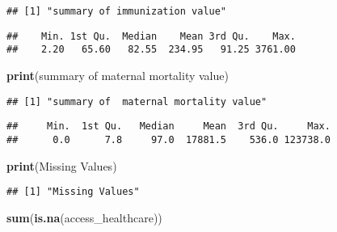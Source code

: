\documentclass[
]{article}
\newenvironment{Shaded}{\begin{snugshade}}{\end{snugshade}}
\newcommand{\FunctionTok}[1]{\textcolor[rgb]{0.13,0.29,0.53}{\textbf{#1}}}
\newcommand{\NormalTok}[1]{#1}
\newcommand{\SpecialCharTok}[1]{\textcolor[rgb]{0.81,0.36,0.00}{\textbf{#1}}}
\newcommand{\StringTok}[1]{\textcolor[rgb]{0.31,0.60,0.02}{#1}}
\begin{document}
\begin{verbatim}
## [1] "summary of immunization value"
\end{verbatim}

\begin{Shaded}
\end{Shaded}

\begin{verbatim}
##    Min. 1st Qu.  Median    Mean 3rd Qu.    Max. 
##    2.20   65.60   82.55  234.95   91.25 3761.00
\end{verbatim}

\begin{Shaded}
\begin{Highlighting}[]
\FunctionTok{print}\NormalTok{(}\StringTok{\textquotesingle{}summary of  maternal mortality value\textquotesingle{}}\NormalTok{)}
\end{Highlighting}
\end{Shaded}

\begin{verbatim}
## [1] "summary of  maternal mortality value"
\end{verbatim}

\begin{Shaded}
\end{Shaded}

\begin{verbatim}
##     Min.  1st Qu.   Median     Mean  3rd Qu.     Max. 
##      0.0      7.8     97.0  17881.5    536.0 123738.0
\end{verbatim}

\begin{Shaded}
\begin{Highlighting}[]
\FunctionTok{print}\NormalTok{(}\StringTok{\textquotesingle{}Missing Values\textquotesingle{}}\NormalTok{)}
\end{Highlighting}
\end{Shaded}

\begin{verbatim}
## [1] "Missing Values"
\end{verbatim}

\begin{Shaded}
\begin{Highlighting}[]
\FunctionTok{sum}\NormalTok{(}\FunctionTok{is.na}\NormalTok{(access\_healthcare))}
\end{Highlighting}
\end{Shaded}
\end{document}
